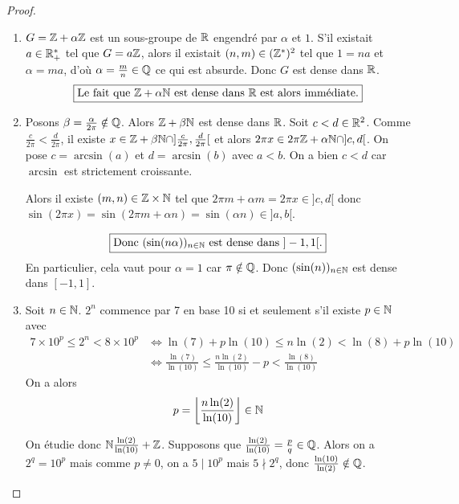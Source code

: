 \documentclass[12pt]{article}
\begin{document}
\begin{proof}
	\phantom{}
	\begin{enumerate}
		\item $G=\mathbb{Z}+\alpha\mathbb{Z}$ est un sous-groupe de $\mathbb{R}$ engendré par $\alpha$ et $1$. S'il existait $a\in\mathbb{R}_{+}^{*}$ tel que $G=a\mathbb{Z}$, alors il existait $(n,m)\in(\mathbb{Z}^{*})^{2}$ tel que $1=na$ et $\alpha=ma$, d'où $\alpha=\frac{m}{n}\in\mathbb{Q}$ ce qui est absurde. Donc $G$ est dense dans $\mathbb{R}$. 
		\begin{equation}
			\boxed{\text{Le fait que }\mathbb{Z}+\alpha\mathbb{N}\text{ est dense dans }\mathbb{R}\text{ est alors immédiate.}}
		\end{equation}

		\item Posons $\beta=\frac{\alpha}{2\pi}\notin\mathbb{Q}$. Alors $\mathbb{Z}+\beta\mathbb{N}$ est dense dans $\mathbb{R}$. Soit $c<d\in\mathbb{R}^{2}$. Comme $\frac{c}{2\pi}<\frac{d}{2\pi}$, il existe $x\in\mathbb{Z}+\beta\mathbb{N}\cap]\frac{c}{2\pi},\frac{d}{2\pi}[$ et alors $2\pi x\in2\pi\mathbb{Z}+\alpha\mathbb{N}\cap]c,d[$. On pose $c=\arcsin(a)$ et $d=\arcsin(b)$ avec $a<b$. On a bien $c<d$ car $\arcsin$ est strictement croissante.
		
		Alors il existe $(m,n)\in\mathbb{Z}\times\mathbb{N}$ tel que $2\pi m+\alpha m=2\pi x\in]c,d[$ donc $\sin(2\pi x)=\sin(2\pi m+\alpha n)=\sin(\alpha n)\in]a,b[$.

		\begin{equation}
			\boxed{\text{Donc }(\sin(n\alpha))_{n\in\mathbb{N}}\text{ est dense dans }]-1,1[.}
		\end{equation}
		En particulier, cela vaut pour $\alpha=1$ car $\pi\notin\mathbb{Q}$. Donc $(\sin(n))_{n\in\mathbb{N}}$ est dense dans $[-1,1]$.

		\item Soit $n\in\mathbb{N}$. $2^{n}$ commence par 7 en base 10 si et seulement s'il existe $p\in\mathbb{N}$ avec 
		\begin{align}
			7\times10^{p}\leqslant2^{n}<8\times10^{p}
			&\Longleftrightarrow \ln(7)+p\ln(10)\leqslant n\ln(2)<\ln(8)+p\ln(10)\\
			&\Longleftrightarrow \frac{\ln(7)}{\ln(10)}\leqslant\frac{n\ln(2)}{\ln(10)}-p<\frac{\ln(8)}{\ln(10)}
		\end{align}
		On a alors 
		\begin{equation}
			p=\left\lfloor\frac{n\ln(2)}{\ln(10)}\right\rfloor\in\mathbb{N}
		\end{equation}

		On étudie donc $\mathbb{N}\frac{\ln(2)}{\ln(10)}+\mathbb{Z}$. Supposons que $\frac{\ln(2)}{\ln(10)}=\frac{p}{q}\in\mathbb{Q}$. Alors on a $2^{q}=10^{p}$ mais comme $p\neq0$, on a $5\mid 10^{p}$ mais $5\nmid 2^{q}$, donc $\frac{\ln(10)}{\ln(2)}\notin\mathbb{Q}$.


\end{enumerate}
\end{proof}
\end{document}
